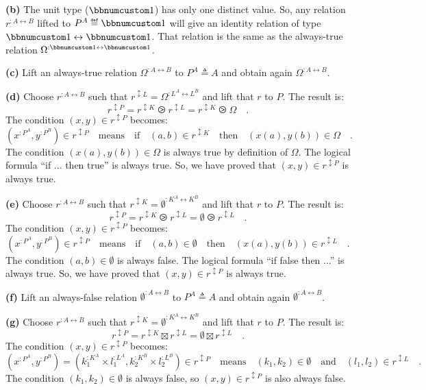 \textbf{(b)} The unit type ($\bbnum 1$) has only one distinct value.
So, any relation $r^{:A\leftrightarrow B}$ lifted to $P^{A}\triangleq\bbnum 1$
will give an identity relation of type $\bbnum 1\leftrightarrow\bbnum 1$.
That relation is the same as the always-true relation $\Omega^{:\bbnum 1\leftrightarrow\bbnum 1}$.

\textbf{(c)} Lift an always-true relation $\Omega^{:A\leftrightarrow B}$
to $P^{A}\triangleq A$ and obtain again $\Omega^{:A\leftrightarrow B}$.

\textbf{(d)} Choose $r^{:A\leftrightarrow B}$ such that $r^{\updownarrow L}=\Omega^{:L^{A}\leftrightarrow L^{B}}$
and lift that $r$ to $P$. The result is:
\[
r^{\updownarrow P}=r^{\updownarrow K}\ogreaterthan r^{\updownarrow L}=r^{\updownarrow K}\ogreaterthan\Omega\quad.
\]
The condition $(x,y)\in r^{\updownarrow P}$ becomes:
\[
(x^{:P^{A}},y^{:P^{B}})\in r^{\updownarrow P}\quad\text{means}\quad\text{if}\quad(a,b)\in r^{\updownarrow K}\quad\text{then}\quad(x(a),y(b))\in\Omega\quad.
\]
The condition $(x(a),y(b))\in\Omega$ is always true by definition
of $\Omega$. The logical formula \textsf{``}if ... then true\textsf{''} is always
true. So, we have proved that $(x,y)\in r^{\updownarrow P}$ is always
true.

\textbf{(e)} Choose $r^{:A\leftrightarrow B}$ such that $r^{\updownarrow K}=\emptyset^{:K^{A}\leftrightarrow K^{B}}$
and lift that $r$ to $P$. The result is:
\[
r^{\updownarrow P}=r^{\updownarrow K}\ogreaterthan r^{\updownarrow L}=\emptyset\ogreaterthan r^{\updownarrow L}\quad.
\]
The condition $(x,y)\in r^{\updownarrow P}$ becomes:
\[
(x^{:P^{A}},y^{:P^{B}})\in r^{\updownarrow P}\quad\text{means}\quad\text{if}\quad(a,b)\in\emptyset\quad\text{then}\quad(x(a),y(b))\in r^{\updownarrow L}\quad.
\]
The condition $(a,b)\in\emptyset$ is always false. The logical formula
\textsf{``}if false then ...\textsf{''} is always true. So, we have proved that $(x,y)\in r^{\updownarrow P}$
is always true.

\textbf{(f)} Lift an always-false relation $\emptyset^{:A\leftrightarrow B}$
to $P^{A}\triangleq A$ and obtain again $\emptyset^{:A\leftrightarrow B}$.

\textbf{(g)} Choose $r^{:A\leftrightarrow B}$ such that $r^{\updownarrow K}=\emptyset^{:K^{A}\leftrightarrow K^{B}}$
and lift that $r$ to $P$. The result is:
\[
r^{\updownarrow P}=r^{\updownarrow K}\boxtimes r^{\updownarrow L}=\emptyset\boxtimes r^{\updownarrow L}\quad.
\]
The condition $(x,y)\in r^{\updownarrow P}$ becomes:
\[
(x^{:P^{A}},y^{:P^{B}})=(k_{1}^{:K^{A}}\times l_{1}^{:L^{A}},k_{2}^{:K^{B}}\times l_{2}^{:L^{B}})\in r^{\updownarrow P}\quad\text{means}\quad(k_{1},k_{2})\in\emptyset\quad\text{and}\quad(l_{1},l_{2})\in r^{\updownarrow L}\quad.
\]
The condition $(k_{1},k_{2})\in\emptyset$ is always false, so $(x,y)\in r^{\updownarrow P}$
is also always false. 

